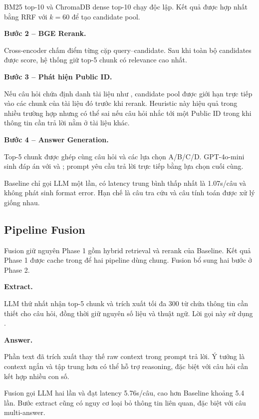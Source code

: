 \documentclass[../DoAn.tex]{subfiles}
\begin{document}
BM25 top-10 và ChromaDB dense top-10 chạy độc lập. Kết quả được hợp nhất bằng RRF với $k=60$ để tạo candidate pool.

\noindent\textbf{Bước 2 -- BGE Rerank.}

Cross-encoder  chấm điểm từng cặp query--candidate. Sau khi toàn bộ candidates được score, hệ thống giữ top-5 chunk có relevance cao nhất.

\noindent\textbf{Bước 3 -- Phát hiện Public ID.}

Nếu câu hỏi chứa định danh tài liệu như , candidate pool được giới hạn trực tiếp vào các chunk của tài liệu đó trước khi rerank. Heuristic này hiệu quả trong nhiều trường hợp nhưng có thể sai nếu câu hỏi nhắc tới một Public ID trong khi thông tin cần trả lời nằm ở tài liệu khác.

\noindent\textbf{Bước 4 -- Answer Generation.}

Top-5 chunk được ghép cùng câu hỏi và các lựa chọn A/B/C/D. GPT-4o-mini sinh đáp án với  và ; prompt yêu cầu trả lời trực tiếp bằng lựa chọn cuối cùng.

Baseline chỉ gọi LLM một lần, có latency trung bình thấp nhất là 1.07s/câu và không phát sinh format error. Hạn chế là câu tra cứu và câu tính toán được xử lý giống nhau.

\subsection{Pipeline Fusion}
\label{subsection:3.3.2}

Fusion giữ nguyên Phase 1 gồm hybrid retrieval và rerank của Baseline. Kết quả Phase 1 được cache trong  để hai pipeline dùng chung. Fusion bổ sung hai bước ở Phase 2.

\noindent\textbf{Extract.}

LLM thứ nhất nhận top-5 chunk và trích xuất tối đa 300 từ chứa thông tin cần thiết cho câu hỏi, đồng thời giữ nguyên số liệu và thuật ngữ. Lời gọi này sử dụng .

\noindent\textbf{Answer.}

Phần text đã trích xuất thay thế raw context trong prompt trả lời. Ý tưởng là context ngắn và tập trung hơn có thể hỗ trợ reasoning, đặc biệt với câu hỏi cần kết hợp nhiều con số.

Fusion gọi LLM hai lần và đạt latency 5.76s/câu, cao hơn Baseline khoảng 5.4 lần. Bước extract cũng có nguy cơ loại bỏ thông tin liên quan, đặc biệt với câu multi-answer.
\end{document}
